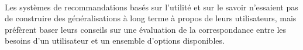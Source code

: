 	\paragraph{}
Les systèmes de recommandations basés sur l’utilité et sur le savoir n’essaient pas de construire des généralisations à long terme à propos de leurs utilisateurs, mais préfèrent baser leurs conseils sur une évaluation de la correspondance entre les besoins d’un utilisateur et un ensemble d’options disponibles.


